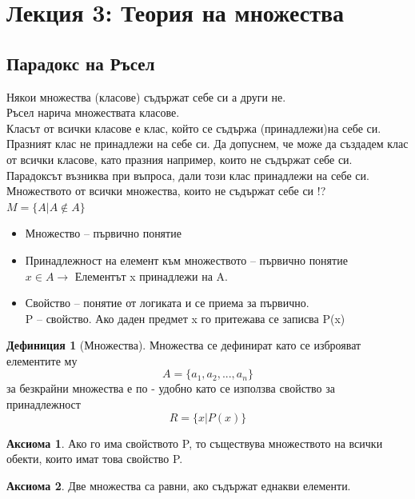 \documentclass[fleqn, 12pt]{article}
\theoremstyle{definition}
\newtheorem{definition}{Дефиниция}[subsection]
\newtheorem{axiom}{Аксиома}[subsection]
\begin{document}
\newpage

\section{Лекция 3: Теория на множества}

\subsection{Парадокс на Ръсел}
Някои множества (класове) съдържат себе си а други не.\\
Ръсел нарича множествата класове.\\
Класът от всички класове е клас, който се съдържа (принадлежи)на себе си. Празният клас не принадлежи на себе си. Да допуснем, че може да създадем клас от всички класове, като празния например, които не съдържат себе си.\\
Парадоксът възниква при въпроса, дали този клас принадлежи на себе си. \\
Множеството от всички множества, които не съдържат себе си !? \\
$M = \{ A | A \notin A \}$\\
\begin{itemize}
	\item Множество – първично понятие
	\item Принадлежност на елемент към множеството – първично понятие \\
$x\in A \rightarrow$ Елементът x принадлежи на A.
	\item Свойство – понятие от логиката и се приема за първично. \\
P – свойство. Ако даден предмет x го притежава се записва P(x)
\end{itemize}

\begin{definition}[Множества]
Множества се дефинират като се изброяват елементите му 
$$A = \{ a_1, a_2, ..., a_n\}$$
за безкрайни множества е по - удобно като се използва свойство за принадлежност 
$$R = \{x | P(x) \} $$
\end{definition}

\begin{axiom}
Ако го има свойството P, то съществува множеството на всички обекти, които имат това свойство P.
\end{axiom}

\begin{axiom}
Две множества са равни, ако съдържат еднакви елементи.
\end{axiom}
\end{document}
